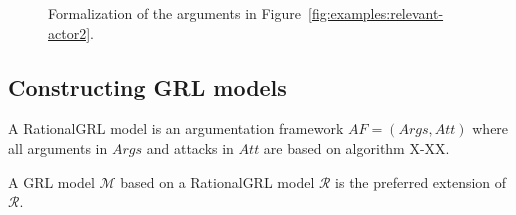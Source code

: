 \begin{figure}[ht!]
\centering
\caption{Formalization of the arguments in Figure~\ref{fig:examples:relevant-actor2}.}
\label{fig:examples:relevant-actor2:formal}
\end{figure}

\subsection{Constructing GRL models}
\label{sect:rationalGRL-GRL}

\begin{definition} A RationalGRL model  is an argumentation framework $AF=(Args,Att)$ where all arguments in $Args$ and attacks in $Att$ are based on algorithm X-XX.  
\end{definition}

\begin{definition} A GRL model $\mathcal{M}$ based on a RationalGRL model $\mathcal{R}$ is the preferred extension of $\mathcal{R}$.  
\end{definition}

